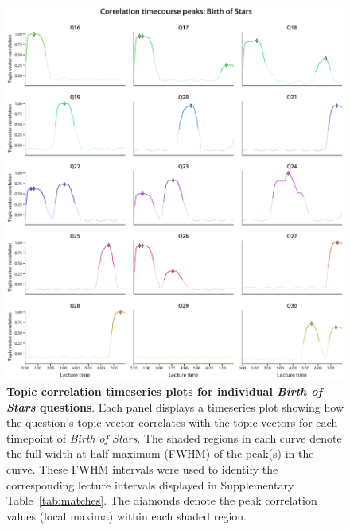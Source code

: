 \documentclass[10pt]{article}
\begin{document}
\begin{figure}[tp]
    \centering
    \includegraphics[width=\textwidth]{figs/bos-qcorrs-peaks}

    \caption{\textbf{Topic correlation timeseries plots for individual
    \textit{Birth of Stars} questions}. Each panel displays a
    timeseries plot showing how the question's topic vector correlates with the
    topic vectors for each timepoint of \textit{Birth of Stars}. The
    shaded regions in each curve denote the full width at half maximum (FWHM)
    of the peak(s) in the curve. These FWHM intervals were used to identify the
    corresponding lecture intervals displayed in Supplementary
    Table~\ref{tab:matches}. The diamonds denote the peak correlation values
    (local maxima) within each shaded region.}

    \label{fig:bos-peaks}
\end{figure}
\end{document}
